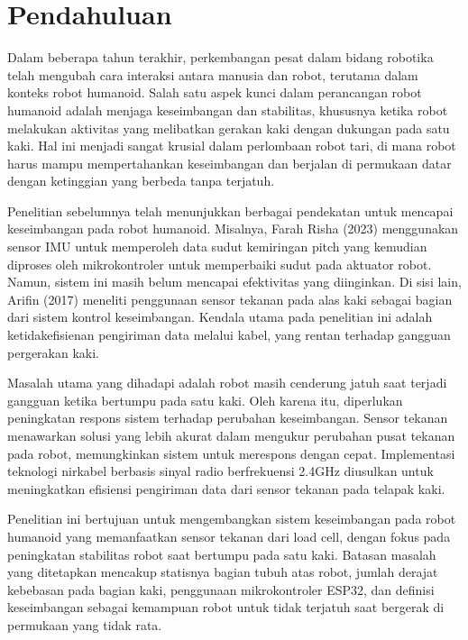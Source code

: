 \section{Pendahuluan}
\label{sec:pendahuluan}

Dalam beberapa tahun terakhir, perkembangan pesat dalam bidang robotika telah mengubah cara interaksi antara manusia dan robot, terutama dalam konteks robot humanoid\cite{chiang2020posture}. Salah satu aspek kunci dalam perancangan robot humanoid adalah menjaga keseimbangan dan stabilitas, khususnya ketika robot melakukan aktivitas yang melibatkan gerakan kaki dengan dukungan pada satu kaki. Hal ini menjadi sangat krusial dalam perlombaan robot tari, di mana robot harus mampu mempertahankan keseimbangan dan berjalan di permukaan datar dengan ketinggian yang berbeda tanpa terjatuh.

Penelitian sebelumnya telah menunjukkan berbagai pendekatan untuk mencapai keseimbangan pada robot humanoid. Misalnya, Farah Risha (2023)\cite{farah} menggunakan sensor IMU untuk memperoleh data sudut kemiringan pitch yang kemudian diproses oleh mikrokontroler untuk memperbaiki sudut pada aktuator robot. Namun, sistem ini masih belum mencapai efektivitas yang diinginkan. Di sisi lain, Arifin (2017)\cite{arifin2017implementasi} meneliti penggunaan sensor tekanan pada alas kaki sebagai bagian dari sistem kontrol keseimbangan. Kendala utama pada penelitian ini adalah ketidakefisienan pengiriman data melalui kabel, yang rentan terhadap gangguan pergerakan kaki.

Masalah utama yang dihadapi adalah robot masih cenderung jatuh saat terjadi gangguan ketika bertumpu pada satu kaki. Oleh karena itu, diperlukan peningkatan respons sistem terhadap perubahan keseimbangan. Sensor tekanan menawarkan solusi yang lebih akurat dalam mengukur perubahan pusat tekanan pada robot, memungkinkan sistem untuk merespons dengan cepat. Implementasi teknologi nirkabel berbasis sinyal radio berfrekuensi 2.4GHz diusulkan untuk meningkatkan efisiensi pengiriman data dari sensor tekanan pada telapak kaki.

Penelitian ini bertujuan untuk mengembangkan sistem keseimbangan pada robot humanoid yang memanfaatkan sensor tekanan dari load cell, dengan fokus pada peningkatan stabilitas robot saat bertumpu pada satu kaki. Batasan masalah yang ditetapkan mencakup statisnya bagian tubuh atas robot, jumlah derajat kebebasan pada bagian kaki, penggunaan mikrokontroler ESP32, dan definisi keseimbangan sebagai kemampuan robot untuk tidak terjatuh saat bergerak di permukaan yang tidak rata.